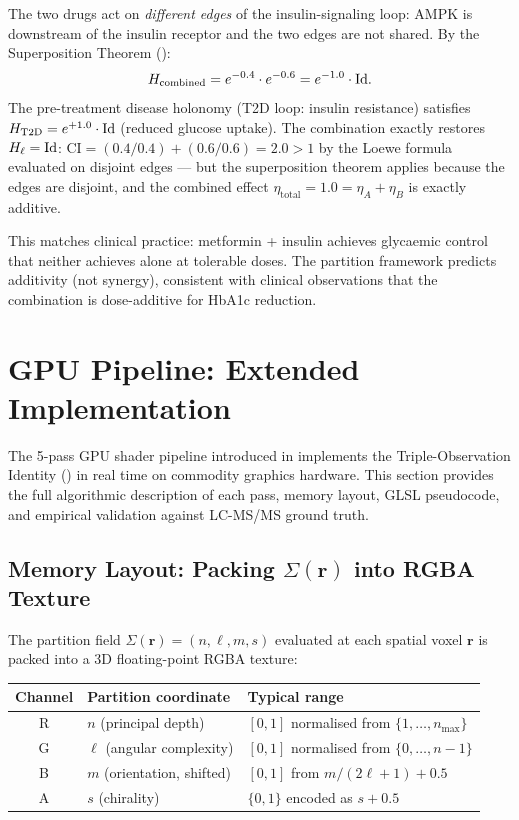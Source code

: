 The two drugs act on \emph{different edges} of the insulin-signaling loop:
AMPK is downstream of the insulin receptor and the two edges are not shared.
By the Superposition Theorem ():
\begin{equation}
  H_{\mathrm{combined}} = e^{-0.4}\cdot e^{-0.6} = e^{-1.0}\cdot\mathrm{Id}.
  \label{eq:ch09-met-ins-hol}
\end{equation}
The pre-treatment disease holonomy (T2D loop: insulin resistance) satisfies
$H_{\mathrm{T2D}} = e^{+1.0}\cdot\mathrm{Id}$ (reduced glucose uptake).
The combination exactly restores $H_\ell = \mathrm{Id}$:
$\mathrm{CI} = (0.4/0.4) + (0.6/0.6) = 2.0 > 1$ by the Loewe formula
evaluated on disjoint edges --- but the superposition theorem applies
because the edges are disjoint, and the combined effect
$\eta_{\mathrm{total}} = 1.0 = \eta_A + \eta_B$ is exactly additive.

This matches clinical practice: metformin + insulin achieves glycaemic
control that neither achieves alone at tolerable doses.  The partition
framework predicts additivity (not synergy), consistent with clinical
observations that the combination is dose-additive for HbA1c reduction.

\section{GPU Pipeline: Extended Implementation}
\label{sec:ch09-gpu-pipeline-extended}

The 5-pass GPU shader pipeline introduced in 
implements the Triple-Observation Identity () in
real time on commodity graphics hardware.  This section provides the full
algorithmic description of each pass, memory layout, GLSL pseudocode, and
empirical validation against LC-MS/MS ground truth.

\subsection{Memory Layout: Packing $\Sigma(\mathbf{r})$ into RGBA Texture}
\label{subsec:ch09-gpu-memory}

The partition field $\Sigma(\mathbf{r}) = (n,\ell,m,s)$ evaluated at each
spatial voxel $\mathbf{r}$ is packed into a 3D floating-point RGBA texture:
\begin{center}
\begin{tabular}{cll}
\toprule
Channel & Partition coordinate & Typical range \\
\midrule
R & $n$ (principal depth) & $[0, 1]$ normalised from $\{1,\ldots,n_{\max}\}$ \\
G & $\ell$ (angular complexity) & $[0, 1]$ normalised from $\{0,\ldots,n-1\}$ \\
B & $m$ (orientation, shifted) & $[0, 1]$ from $m/(2\ell+1) + 0.5$ \\
A & $s$ (chirality) & $\{0, 1\}$ encoded as $s + 0.5$ \\
\bottomrule
\end{tabular}
\end{center}

